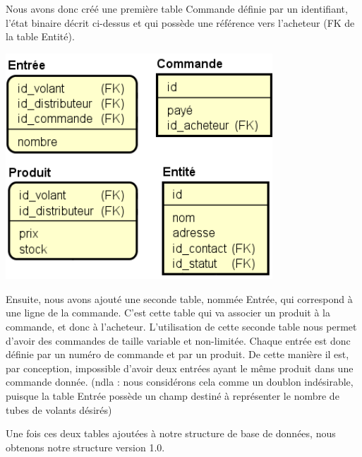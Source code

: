 \documentclass[french,a4paper,12pt]{report}
\begin{document}
Nous avons donc créé une première table Commande définie par un identifiant,
l'état binaire décrit ci-dessus et qui possède une référence vers l'acheteur
(FK de la table Entité).

\includegraphics[width=10cm]{ensemble3.png}

Ensuite, nous avons ajouté une seconde table, nommée Entrée, qui correspond à
une ligne de la commande. C'est cette table qui va associer un produit à la
commande, et donc à l'acheteur. L'utilisation de cette seconde table nous permet
 d'avoir des commandes de taille variable et non-limitée.
Chaque entrée est donc définie par un numéro de commande et par un produit.
De cette manière il est, par conception, impossible d'avoir deux entrées ayant
 le même produit dans une commande donnée.
(ndla : nous considérons cela comme un doublon indésirable, puisque la table
Entrée possède un champ destiné à représenter le nombre de tubes de volants désirés)

Une fois ces deux tables ajoutées à notre structure de base de données, nous
obtenons notre structure version 1.0.
\end{document}
